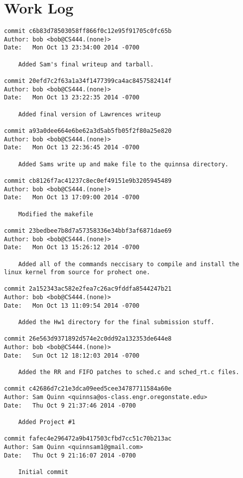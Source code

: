 \documentclass[letterpaper,10pt,notitlepage,fleqn]{article}
\begin{document}
\section*{Work Log}
\begin{verbatim}
commit c6b83d78503058ff866f0c12e95f91705c0fc65b
Author: bob <bob@CS444.(none)>
Date:   Mon Oct 13 23:34:00 2014 -0700

    Added Sam's final writeup and tarball.

commit 20efd7c2f63a1a34f1477399ca4ac8457582414f
Author: bob <bob@CS444.(none)>
Date:   Mon Oct 13 23:22:35 2014 -0700

    Added final version of Lawrences writeup

commit a93a0dee664e6be62a3d5ab5fb05f2f80a25e820
Author: bob <bob@CS444.(none)>
Date:   Mon Oct 13 22:36:45 2014 -0700

    Added Sams write up and make file to the quinnsa directory.

commit cb8126f7ac41237c8ec0ef49151e9b3205945489
Author: bob <bob@CS444.(none)>
Date:   Mon Oct 13 17:09:00 2014 -0700

    Modified the makefile

commit 23bedbee7b8d7a57358336e34bbf3af6871dae69
Author: bob <bob@CS444.(none)>
Date:   Mon Oct 13 15:26:12 2014 -0700

    Added all of the commands neccisary to compile and install the linux kernel from source for prohect one.

commit 2a152343ac582e2fea7c26ac9fddfa8544247b21
Author: bob <bob@CS444.(none)>
Date:   Mon Oct 13 11:09:54 2014 -0700

    Added the Hw1 directory for the final submission stuff.

commit 26e563d9371892d574e2c0dd92a132353de644e8
Author: bob <bob@CS444.(none)>
Date:   Sun Oct 12 18:12:03 2014 -0700

    Added the RR and FIFO patches to sched.c and sched_rt.c files.

commit c42686d7c21e3dca09eed5cee34787711584a60e
Author: Sam Quinn <quinnsa@os-class.engr.oregonstate.edu>
Date:   Thu Oct 9 21:37:46 2014 -0700

    Added Project #1

commit fafec4e296472a9b417503cfbd7cc51c70b213ac
Author: Sam Quinn <quinnsam1@gmail.com>
Date:   Thu Oct 9 21:16:07 2014 -0700

    Initial commit
\end{verbatim}
\end{document}
